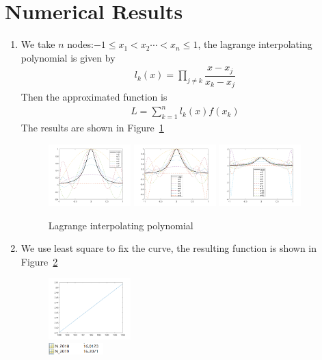 \documentclass[a4paper,11pt]{article}
\begin{document}
\section{Numerical Results}
\begin{enumerate}
    \item We take $n$ nodes:$-1\leq x_1<x_2\dotsm<x_n\leq 1$, the lagrange interpolating polynomial is given by
    \begin{eqnarray}
        l_{k}(x)=\prod_{j\neq k}\dfrac{x-x_j}{x_k-x_j}
    \end{eqnarray}
    Then the approximated function is 
    \begin{eqnarray}
        L=\sum_{k=1}^{n}l_{k}(x)f(x_k)
    \end{eqnarray}
    The results are shown in Figure~\ref{fig1}
    \begin{figure}[h]
        \centering
        \includegraphics[width=0.3\textwidth]{1.png}
        \includegraphics[width=0.3\textwidth]{2.png}
        \includegraphics[width=0.3\textwidth]{3.png}\caption{Lagrange interpolating polynomial}
        \label{fig1}
    \end{figure} 

    \item We use least square to fix the curve, the resulting function is shown in Figure~\ref{fig2}
    \begin{figure}[h]
        \centering
        \includegraphics[width=0.3\textwidth]{4.png}\\
        \includegraphics[width=0.2\textwidth]{5.png}\caption{}
        \label{fig2}
    \end{figure}


\end{enumerate}
\end{document}
